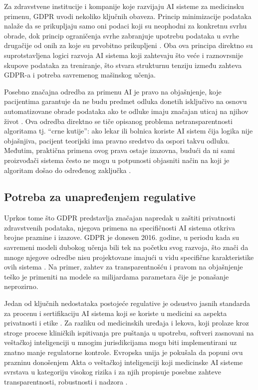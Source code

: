 \documentclass[12pt]{article}
\begin{document}
Za zdravstvene institucije i kompanije koje razvijaju AI sisteme za medicinsku primenu, GDPR uvodi nekoliko ključnih obaveza. Princip minimizacije podataka nalaže da se prikupljaju samo oni podaci koji su neophodni za konkretnu svrhu obrade, dok princip ograničenja svrhe zabranjuje upotrebu podataka u svrhe drugačije od onih za koje su prvobitno prikupljeni \cite{kumar2025}. Oba ova principa direktno su suprotstavljena logici razvoja AI sistema koji zahtevaju što veće i raznovrsnije skupove podataka za treniranje, što stvara strukturnu 
tenziju između zahteva GDPR-a i potreba savremenog mašinskog učenja.
 
Posebno značajna odredba za primenu AI je pravo na objašnjenje, koje pacijentima garantuje da ne budu predmet odluka donetih isključivo na osnovu automatizovane obrade podataka ako te odluke imaju značajan uticaj na njihov život \cite{gdpr2016}. 
Ova odredba direktno se tiče opisanog problema netransparentnosti algoritama tj. ``crne kutije'': ako lekar ili bolnica koriste AI sistem čija logika nije objašnjiva, pacijent teorijski ima pravno sredstvo da ospori takvu odluku. Međutim, praktična primena ovog prava ostaje izazovna, budući da ni sami proizvođači sistema često ne mogu u potpunosti objasniti način na koji je algoritam došao do određenog zaključka \cite{murdoch2021}.
 
\subsection{Potreba za unapređenjem regulative}
Uprkos tome što GDPR predstavlja značajan napredak u zaštiti privatnosti 
zdravstvenih podataka, njegova primena na specifičnosti AI sistema otkriva brojne praznine i izazove. GDPR je donesen 2016. godine, u periodu kada su savremeni modeli dubokog učenja bili tek na početku svog razvoja, što znači da mnoge njegove odredbe nisu projektovane imajući u vidu specifične karakteristike ovih sistema \cite{kumar2025}. Na primer, zahtev za transparentnošću i pravom na objašnjenje teško je primeniti na modele sa milijardama parametara čije je ponašanje neprozirno.
 
Jedan od ključnih nedostataka postojeće regulative je odsustvo jasnih 
standarda za procenu i sertifikaciju AI sistema koji se koriste u medicini sa aspekta privatnosti i etike \cite{murdoch2021}. Za razliku od medicinskih uređaja i lekova, koji prolaze kroz stroge procese kliničkih ispitivanja pre puštanja u upotrebu, softveri zasnovani na veštačkoj inteligenciji u mnogim jurisdikcijama mogu biti implementirani uz znatno manje regulatorne kontrole. Evropska unija je pokušala da popuni ovu prazninu donošenjem Akta o veštačkoj inteligenciji koji medicinske AI sisteme svrstava u kategoriju visokog rizika i za njih propisuje posebne zahteve transparentnosti, robustnosti i nadzora \cite{kumar2025}.
 
\end{document}
